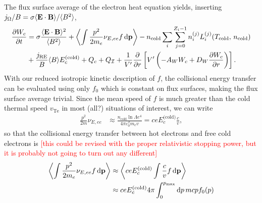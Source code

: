 \documentclass[11pt,a4paper]{article}
\newcommand{\rd}{\ensuremath{\mathrm{d}}}
\newcommand{\sub}[1]{\ensuremath{_{\text{#1}}}}
\renewcommand{\b}[1]{\ensuremath{ {\bf #1 } }}
\begin{document}
The flux surface average of  the electron heat equation yields, inserting $j_\Omega/B = \sigma \langle \b{E}\cdot\b{B}\rangle/\langle B^2\rangle$, 
\begin{align}
\frac{\partial W_c}{\partial t} &= \sigma \frac{\langle \b{E}\cdot\b{B}\rangle^2}{\langle B^2\rangle}+ \left\langle\int  \frac{p^2}{2m_e}\nu_{E,ee} f \,\rd \b{p}\right\rangle -n\sub{cold} \sum_i \sum_{j=0}^{Z_i-1} n_i^{(j)} L_{i}^{(j)}(T\sub{cold},\,n\sub{cold})  \nonumber \\
&+ \frac{j\sub{RE}}{B}\langle B\rangle E_c^\text{(cold)} + Q_c + Q_\mathcal{I} + \frac{1}{V'}\frac{\partial}{\partial r}\left[V'\left(-A_W W_c + D_W\frac{\partial W_c}{\partial r}\right)\right].
\end{align}
With our reduced isotropic kinetic description of $f$, the collisional energy transfer can be evaluated using only $f_0$ which is constant on flux surfaces, making the flux surface average trivial.
%
%
Since the mean speed of $f$ is much greater than the cold thermal speed $v\sub{Te}$ in most (all?) situations of interest, we can write
\begin{align}
\frac{p^2}{2m}\nu_{E,ee} &\approx \frac{n\sub{cold}\ln\Lambda e^4}{4\pi\varepsilon_0^2 m_e v} = ceE_c^\text{(cold)}\frac{c}{v},
\end{align}
so that the collisional energy transfer between hot electrons and free cold electrons is \textcolor{red}{[this could be revised with the proper relativistic stopping power, but it is probably not going to turn out any different]}
\begin{align}
\left\langle \int  \frac{p^2}{2m_e}\nu_{E,ee} f \,\rd \b{p} \right\rangle &\approx \left\langle ceE_c^\text{(cold)} \int \frac{c}{v}f\,\rd\b{p}\right\rangle\nonumber \\
 &\approx ceE_c^\text{(cold)}4\pi \int_0^{p\sub{max}} \rd p  \, mcp f_0(p)
\end{align}
\end{document}
